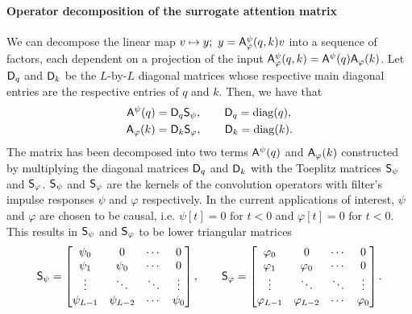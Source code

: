 \paragraph{Operator decomposition of the surrogate attention matrix}
%
We can decompose the linear map $v\mapsto y;~ y = \mathsf{A}_\varphi^\psi(q,k)v$ into a sequence of factors, each dependent on a projection of the input $\mathsf{A}_\varphi^\psi(q,k) = \mathsf{A}^\psi(q) \mathsf{A}_\varphi(k)$. Let $\mathsf{D}_q$ and $\mathsf{D}_k$ be the $L$-by-$L$ diagonal matrices whose respective main diagonal entries are the respective entries of $q$ and $k$. Then, we have that
%
\begin{equation}\label{eq:linear_attention_matrix3}
    \begin{aligned}
        \mathsf{A}^\psi(q) &= \mathsf{D}_q \mathsf{S}_\psi,\qquad \mathsf{D}_q = \operatorname{diag}(q), \\
        \mathsf{A}_\varphi(k) &= \mathsf{D}_k\mathsf{S}_\varphi,\qquad \mathsf{D}_k = \operatorname{diag}(k).
    \end{aligned}
\end{equation}
%
The matrix has been decomposed into two terms $\mathsf{A}^\psi(q)$ and $\mathsf{A}_\varphi(k)$ constructed by multiplying the diagonal matrices $\mathsf{D}_q$ and $\mathsf{D}_k$ with the Toeplitz matrices $\mathsf{S}_\psi$ and $\mathsf{S}_\varphi$. $\mathsf{S}_\psi$ and $\mathsf{S}_\varphi$ are the kernels of the convolution operators with filter's impulse responses $\psi$ and $\varphi$ respectively. In the current applications of interest, $\psi$ and $\varphi$ are chosen to be causal, i.e. $\psi[t]=0 \text{ for } t<0$ and $\varphi[t]=0 \text{ for } t<0$. This results in $\mathsf{S}_\psi$ and $\mathsf{S}_\varphi$ to be lower triangular matrices 
%
\begin{equation}
    \mathsf{S}_\psi = \begin{bmatrix}
        \psi_0 & 0 & \cdots & 0 \\
        \psi_1 & \psi_0 & \cdots & 0 \\
        \vdots & \ddots & \ddots & \vdots \\
        \psi_{L-1} & \psi_{L-2} & \cdots & \psi_0
    \end{bmatrix}, \qquad
    \mathsf{S}_\varphi = \begin{bmatrix}
        \varphi_0 & 0 & \cdots & 0 \\
        \varphi_1 & \varphi_0 & \cdots & 0 \\
        \vdots & \ddots & \ddots & \vdots \\
        \varphi_{L-1} & \varphi_{L-2} & \cdots & \varphi_0
    \end{bmatrix}.
\end{equation}
